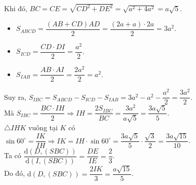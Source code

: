 \begin{bt}
{Khi đó, $BC=CE=\sqrt{CD^2+DE^2}=\sqrt{a^2+4a^2}=a\sqrt{5}$.
\begin{itemize}
	\item $S_{ABCD}=\dfrac{(AB+CD)AD}{2}=\dfrac{(2a+a)\cdot 2a}{2}=3a^2$.
	\item $S_{ICD}=\dfrac{CD\cdot DI}{2}=\dfrac{a^2}{2}$.
	\item $S_{IAB}=\dfrac{AB\cdot AI}{2}=\dfrac{2a^2}{2}=a^2$.
\end{itemize}
Suy ra, $S_{IBC}=S_{ABCD}-S_{ICD}-S_{IAB}=3a^2-a^2-\dfrac{a^2}{2}=\dfrac{3a^2}{2}$.\\
Mà $S_{IBC}=\dfrac{BC\cdot IH}{2}\Rightarrow IH=\dfrac{2S_{IBC}}{BC}=\dfrac{3a^2}{a\sqrt{5}}=\dfrac{3a\sqrt{5}}{5}$.\\
$\triangle IHK$ vuông tại $K$ có $\sin 60^\circ=\dfrac{IK}{IH}\Rightarrow IK=IH\cdot \sin 60^\circ=\dfrac{3a\sqrt{5}}{5}\cdot\dfrac{\sqrt{3}}{2}=\dfrac{3a\sqrt{15}}{10}$.\\
Ta có $\dfrac{\mathrm{d}(D,(SBC))}{\mathrm{d}(I,(SBC))}=\dfrac{DE}{IE}=\dfrac{2}{3}$.\\
Do đó, $\mathrm{d}(D,(SBC))=\dfrac{2IK}{3}=\dfrac{a\sqrt{15}}{5}$.
}
\end{bt}

